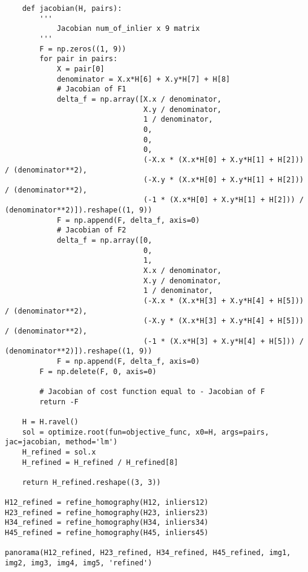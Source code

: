 \documentclass[11pt]{article}
\begin{document}
\begin{lstlisting}
    def jacobian(H, pairs):
        '''
            Jacobian num_of_inlier x 9 matrix
        '''
        F = np.zeros((1, 9))
        for pair in pairs:
            X = pair[0]
            denominator = X.x*H[6] + X.y*H[7] + H[8]
            # Jacobian of F1
            delta_f = np.array([X.x / denominator,
                                X.y / denominator,
                                1 / denominator,
                                0,
                                0,
                                0,
                                (-X.x * (X.x*H[0] + X.y*H[1] + H[2])) / (denominator**2),
                                (-X.y * (X.x*H[0] + X.y*H[1] + H[2])) / (denominator**2),
                                (-1 * (X.x*H[0] + X.y*H[1] + H[2])) / (denominator**2)]).reshape((1, 9))
            F = np.append(F, delta_f, axis=0)
            # Jacobian of F2
            delta_f = np.array([0,
                                0,
                                1,
                                X.x / denominator,
                                X.y / denominator,
                                1 / denominator,
                                (-X.x * (X.x*H[3] + X.y*H[4] + H[5])) / (denominator**2),
                                (-X.y * (X.x*H[3] + X.y*H[4] + H[5])) / (denominator**2),
                                (-1 * (X.x*H[3] + X.y*H[4] + H[5])) / (denominator**2)]).reshape((1, 9))
            F = np.append(F, delta_f, axis=0)
        F = np.delete(F, 0, axis=0)

        # Jacobian of cost function equal to - Jacobian of F
        return -F

    H = H.ravel()
    sol = optimize.root(fun=objective_func, x0=H, args=pairs, jac=jacobian, method='lm')
    H_refined = sol.x
    H_refined = H_refined / H_refined[8]
    
    return H_refined.reshape((3, 3))

H12_refined = refine_homography(H12, inliers12)
H23_refined = refine_homography(H23, inliers23)
H34_refined = refine_homography(H34, inliers34)
H45_refined = refine_homography(H45, inliers45)

panorama(H12_refined, H23_refined, H34_refined, H45_refined, img1, img2, img3, img4, img5, 'refined')

\end{lstlisting}

\end{document}
